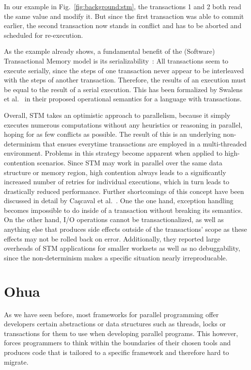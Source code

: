 In our example in Fig.~\ref{fig:background:stm}, the transactions 1 and 2 both read the same value and modify it.
But since the first transaction was able to commit earlier, the second transaction now stands in conflict and has to be aborted and scheduled for re-execution.

As the example already shows, a fundamental benefit of the (Software) Transactional Memory model is its serializability~\cite{swalens2016transactional}:
All transactions seem to execute serially, since the steps of one transaction never appear to be interleaved with the steps of another transaction.
Therefore, the results of an execution must be equal to the result of a serial execution.
This has been formalized by Swalens et al.~\cite{swalens2016transactional} in their proposed operational semantics for a language with transactions.

Overall, STM takes an optimistic approach to parallelism, because it simply executes numerous computations without any heuristics or reasoning in parallel, hoping for as few conflicts as possible.
The result of this is an underlying non-determinism that ensues everytime transactions are employed in a multi-threaded environment.
Problems in this strategy become apparent when applied to high-contention scenarios.
Since STM may work in parallel over the same data structure or memory region, high contention always leads to a significantly increased number of retries for individual executions, which in turn leads to drastically reduced performance.
Further shortcomings of this concept have been discussed in detail by Caşcaval et al.~\cite{cascaval2008software}.
One the one hand, exception handling becomes impossible to do inside of a transaction without breaking its semantics.
On the other hand, I/O operations cannot be transactionalized, as well as anything else that produces side effects outside of the transactions' scope as these effects may not be rolled back on error.
Additionally, they reported large overheads of STM applications for smaller worksets as well as no debuggability, since the non-determinism makes a specific situation nearly irreproducable.


\section{Ohua}
\label{sec:background:ohua}

As we have seen before, most frameworks for parallel programming offer developers certain abstractions or data structures such as threads, locks or transactions for them to use when developing parallel programs.
This however, forces programmers to think within the boundaries of their chosen tools and produces code that is tailored to a specific framework and therefore hard to migrate.

